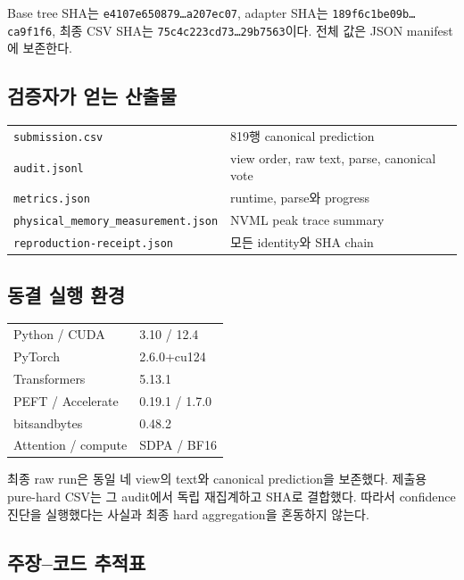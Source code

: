 \documentclass[9pt,a4paper]{extarticle}
\newcommand{\code}[1]{\texttt{\footnotesize #1}}
\newcommand{\tightnote}[1]{{\scriptsize #1}}
\begin{document}
\begin{multicols}{2}
Base tree SHA는
\code{e4107e650879\ldots a207ec07}, adapter SHA는
\code{189f6c1be09b\ldots ca9f1f6}, 최종 CSV SHA는
\code{75c4c223cd73\ldots 29b7563}이다. 전체 값은 JSON manifest에 보존한다.

\subsection{검증자가 얻는 산출물}

\begin{tabularx}{\linewidth}{@{}lY@{}}
\toprule
\code{submission.csv} & 819행 canonical prediction\\
\code{audit.jsonl} & view order, raw text, parse, canonical vote\\
\code{metrics.json} & runtime, parse와 progress\\
\code{physical\_memory\_measurement.json} & NVML peak trace summary\\
\code{reproduction-receipt.json} & 모든 identity와 SHA chain\\
\bottomrule
\end{tabularx}

\subsection{동결 실행 환경}
\begin{tabularx}{\linewidth}{@{}lY@{}}
\toprule
Python / CUDA & 3.10 / 12.4\\
PyTorch & 2.6.0+cu124\\
Transformers & 5.13.1\\
PEFT / Accelerate & 0.19.1 / 1.7.0\\
bitsandbytes & 0.48.2\\
Attention / compute & SDPA / BF16\\
\bottomrule
\end{tabularx}

\tightnote{최종 raw run은 동일 네 view의 text와 canonical prediction을 보존했다.
제출용 pure-hard CSV는 그 audit에서 독립 재집계하고 SHA로 결합했다. 따라서
confidence 진단을 실행했다는 사실과 최종 hard aggregation을 혼동하지 않는다.}

\columnbreak
\subsection{주장--코드 추적표}


\end{multicols}
\end{document}
